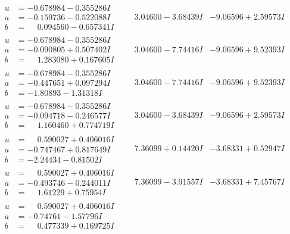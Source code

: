 \documentclass[1p]{elsarticle_modified}
\theoremstyle{definition}
\begin{document}
$$\begin{array}{c|c|c}
\begin{aligned}
u &= -0.678984 - 0.355286 I \\
a &= -0.159736 - 0.522088 I \\
b &= \phantom{-}0.094560 - 0.657341 I\end{aligned}
 & \phantom{-}3.04600 - 3.68439 I & -9.06596 + 2.59573 I \\ \hline\begin{aligned}
u &= -0.678984 - 0.355286 I \\
a &= -0.090805 + 0.507402 I \\
b &= \phantom{-}1.283080 + 0.167605 I\end{aligned}
 & \phantom{-}3.04600 - 7.74416 I & -9.06596 + 9.52393 I \\ \hline\begin{aligned}
u &= -0.678984 - 0.355286 I \\
a &= -0.447651 + 0.097294 I \\
b &= -1.80893 - 1.31318 I\end{aligned}
 & \phantom{-}3.04600 - 7.74416 I & -9.06596 + 9.52393 I \\ \hline\begin{aligned}
u &= -0.678984 - 0.355286 I \\
a &= -0.094718 - 0.246577 I \\
b &= \phantom{-}1.160460 + 0.774719 I\end{aligned}
 & \phantom{-}3.04600 - 3.68439 I & -9.06596 + 2.59573 I \\ \hline\begin{aligned}
u &= \phantom{-}0.590027 + 0.406016 I \\
a &= -0.747467 + 0.817649 I \\
b &= -2.24434 - 0.81502 I\end{aligned}
 & \phantom{-}7.36099 + 0.14420 I & -3.68331 + 0.52947 I \\ \hline\begin{aligned}
u &= \phantom{-}0.590027 + 0.406016 I \\
a &= -0.493746 - 0.244011 I \\
b &= \phantom{-}1.61229 + 0.75954 I\end{aligned}
 & \phantom{-}7.36099 - 3.91557 I & -3.68331 + 7.45767 I \\ \hline\begin{aligned}
u &= \phantom{-}0.590027 + 0.406016 I \\
a &= -0.74761 - 1.57796 I \\
b &= \phantom{-}0.477339 + 0.169725 I\end{aligned}

\end{array}$$
\end{document}

